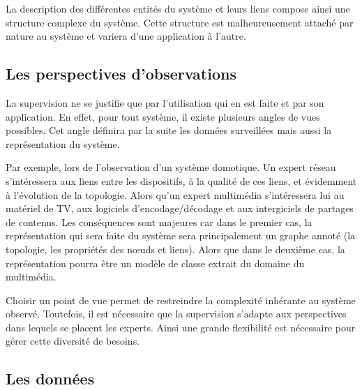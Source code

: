 La description des différentes entités du système et leurs liens compose ainsi une structure complexe du système. Cette structure est malheureusement attaché par nature au système et variera d'une application à l'autre.

\subsection{Les perspectives d'observations}\label{sec:intro:problematique:observation}
La supervision ne se justifie que par l'utilisation qui en est faite et par son application. En effet, pour tout système, il existe plusieurs angles de vues possibles. Cet angle définira par la suite les données surveillées mais aussi la représentation du système.

Par exemple, lors de l'observation d'un système domotique. Un expert réseau s'intéressera aux liens entre les dispositifs, à la qualité de ces liens, et évidemment à l'évolution de la topologie. Alors qu'un expert multimédia s'intéressera lui au matériel de TV, aux logiciels d'encodage/décodage et aux intergiciels de partages de contenus. Les conséquences sont majeures car dans le premier cas, la représentation qui sera faite du système sera principalement un graphe annoté (la topologie, les propriétés des nœuds et liens). Alors que dans le deuxième cas, la représentation pourra être un modèle de classe extrait du domaine du multimédia.

Choisir un point de vue permet de restreindre la complexité inhérante au système observé. Toutefois, il est nécessaire que la supervision s'adapte aux perspectives dans lequels se placent les experts. Ainsi une grande flexibilité est nécessaire pour gérer cette diversité de besoins.

\subsection{Les données}\label{sec:intro:problematique:data}

